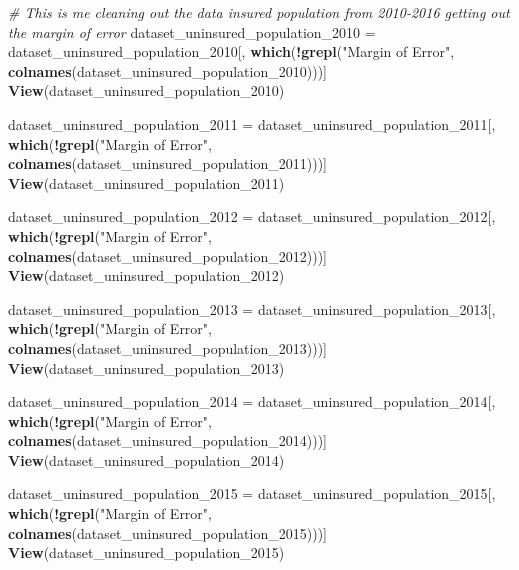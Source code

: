 \documentclass[
]{article}
\newenvironment{Shaded}{\begin{snugshade}}{\end{snugshade}}
\newcommand{\CommentTok}[1]{\textcolor[rgb]{0.56,0.35,0.01}{\textit{#1}}}
\newcommand{\FunctionTok}[1]{\textcolor[rgb]{0.13,0.29,0.53}{\textbf{#1}}}
\newcommand{\NormalTok}[1]{#1}
\newcommand{\OtherTok}[1]{\textcolor[rgb]{0.56,0.35,0.01}{#1}}
\newcommand{\SpecialCharTok}[1]{\textcolor[rgb]{0.81,0.36,0.00}{\textbf{#1}}}
\newcommand{\StringTok}[1]{\textcolor[rgb]{0.31,0.60,0.02}{#1}}
\begin{document}
\begin{Shaded}
\begin{Highlighting}[]
\CommentTok{\# This is me cleaning out the data insured population from 2010{-}2016 getting out the margin of error}
\NormalTok{dataset\_uninsured\_population\_2010 }\OtherTok{=}\NormalTok{ dataset\_uninsured\_population\_2010[, }\FunctionTok{which}\NormalTok{(}\SpecialCharTok{!}\FunctionTok{grepl}\NormalTok{(}\StringTok{"Margin of Error"}\NormalTok{, }\FunctionTok{colnames}\NormalTok{(dataset\_uninsured\_population\_2010)))]}
\FunctionTok{View}\NormalTok{(dataset\_uninsured\_population\_2010)}

\NormalTok{dataset\_uninsured\_population\_2011 }\OtherTok{=}\NormalTok{ dataset\_uninsured\_population\_2011[, }\FunctionTok{which}\NormalTok{(}\SpecialCharTok{!}\FunctionTok{grepl}\NormalTok{(}\StringTok{"Margin of Error"}\NormalTok{, }\FunctionTok{colnames}\NormalTok{(dataset\_uninsured\_population\_2011)))]}
\FunctionTok{View}\NormalTok{(dataset\_uninsured\_population\_2011)}

\NormalTok{dataset\_uninsured\_population\_2012 }\OtherTok{=}\NormalTok{ dataset\_uninsured\_population\_2012[, }\FunctionTok{which}\NormalTok{(}\SpecialCharTok{!}\FunctionTok{grepl}\NormalTok{(}\StringTok{"Margin of Error"}\NormalTok{, }\FunctionTok{colnames}\NormalTok{(dataset\_uninsured\_population\_2012)))]}
\FunctionTok{View}\NormalTok{(dataset\_uninsured\_population\_2012)}

\NormalTok{dataset\_uninsured\_population\_2013 }\OtherTok{=}\NormalTok{ dataset\_uninsured\_population\_2013[, }\FunctionTok{which}\NormalTok{(}\SpecialCharTok{!}\FunctionTok{grepl}\NormalTok{(}\StringTok{"Margin of Error"}\NormalTok{, }\FunctionTok{colnames}\NormalTok{(dataset\_uninsured\_population\_2013)))]}
\FunctionTok{View}\NormalTok{(dataset\_uninsured\_population\_2013)}

\NormalTok{dataset\_uninsured\_population\_2014 }\OtherTok{=}\NormalTok{ dataset\_uninsured\_population\_2014[, }\FunctionTok{which}\NormalTok{(}\SpecialCharTok{!}\FunctionTok{grepl}\NormalTok{(}\StringTok{"Margin of Error"}\NormalTok{, }\FunctionTok{colnames}\NormalTok{(dataset\_uninsured\_population\_2014)))]}
\FunctionTok{View}\NormalTok{(dataset\_uninsured\_population\_2014)}

\NormalTok{dataset\_uninsured\_population\_2015 }\OtherTok{=}\NormalTok{ dataset\_uninsured\_population\_2015[, }\FunctionTok{which}\NormalTok{(}\SpecialCharTok{!}\FunctionTok{grepl}\NormalTok{(}\StringTok{"Margin of Error"}\NormalTok{, }\FunctionTok{colnames}\NormalTok{(dataset\_uninsured\_population\_2015)))]}
\FunctionTok{View}\NormalTok{(dataset\_uninsured\_population\_2015)}


\end{Highlighting}
\end{Shaded}
\end{document}
